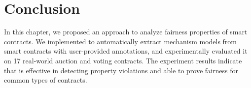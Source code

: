 
\section{Conclusion}\label{Sec_Conclusion}
In this chapter, we proposed an approach to analyze fairness properties of smart
contracts.
We implemented \faircon to automatically extract mechanism models from smart contracts with
user-provided annotations, and experimentally evaluated it on 17 real-world auction and
voting contracts.
The experiment results indicate that \faircon is effective in detecting property violations
and able to prove fairness for common types of contracts.


